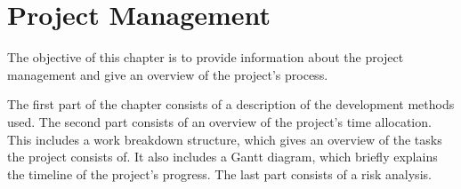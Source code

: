 \chapter{Project Management}

The objective of this chapter is to provide information about the project management and give an overview of the project's process. 

The first part of the chapter consists of a description of the development methods used. The second part consists of an overview of the project's time allocation. This includes a work breakdown structure, which gives an overview of the tasks the project consists of. It also includes a Gantt diagram, which briefly explains the timeline of the project's progress. The last part consists of a risk analysis.







